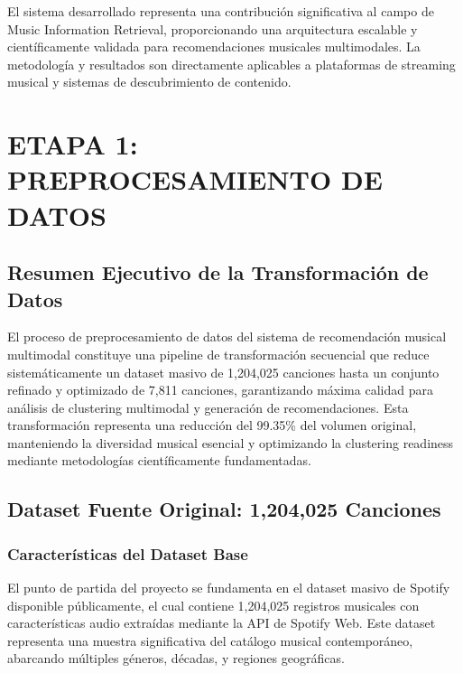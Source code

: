 \documentclass[12pt,a4paper]{report}
\begin{document}
El sistema desarrollado representa una contribución significativa al campo de Music Information Retrieval, proporcionando una arquitectura escalable y científicamente validada para recomendaciones musicales multimodales. La metodología y resultados son directamente aplicables a plataformas de streaming musical y sistemas de descubrimiento de contenido.

\tableofcontents
\newpage

\chapter{ETAPA 1: PREPROCESAMIENTO DE DATOS}
\label{chap:preprocesamiento}

\section{Resumen Ejecutivo de la Transformación de Datos}

El proceso de preprocesamiento de datos del sistema de recomendación musical multimodal constituye una pipeline de transformación secuencial que reduce sistemáticamente un dataset masivo de 1,204,025 canciones hasta un conjunto refinado y optimizado de 7,811 canciones, garantizando máxima calidad para análisis de clustering multimodal y generación de recomendaciones. Esta transformación representa una reducción del 99.35\% del volumen original, manteniendo la diversidad musical esencial y optimizando la clustering readiness mediante metodologías científicamente fundamentadas.

\section{Dataset Fuente Original: 1,204,025 Canciones}

\subsection{Características del Dataset Base}

El punto de partida del proyecto se fundamenta en el dataset masivo de Spotify disponible públicamente, el cual contiene 1,204,025 registros musicales con características audio extraídas mediante la API de Spotify Web. Este dataset representa una muestra significativa del catálogo musical contemporáneo, abarcando múltiples géneros, décadas, y regiones geográficas.
\end{document}
